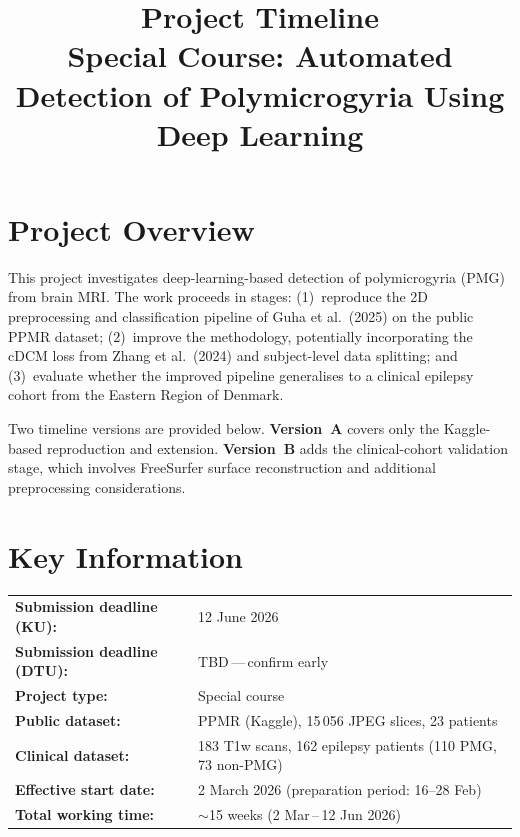 \documentclass[a4paper,11pt]{article}
\title{Project Timeline\\[0.3em]
\large Special Course: Automated Detection of Polymicrogyria Using Deep Learning}
\author{}
\date{}
\begin{document}
\maketitle

\section*{Project Overview}

This project investigates deep-learning-based detection of polymicrogyria (PMG) from brain MRI.
The work proceeds in stages: (1)~reproduce the 2D preprocessing and classification pipeline of Guha et al.\ (2025) on the public PPMR dataset; (2)~improve the methodology, potentially incorporating the cDCM loss from Zhang et al.\ (2024) and subject-level data splitting; and (3)~evaluate whether the improved pipeline generalises to a clinical epilepsy cohort from the Eastern Region of Denmark.

Two timeline versions are provided below.
\textbf{Version~A} covers only the Kaggle-based reproduction and extension.
\textbf{Version~B} adds the clinical-cohort validation stage, which involves FreeSurfer surface reconstruction and additional preprocessing considerations.

\section*{Key Information}

\begin{tabularx}{\textwidth}{@{}lX@{}}
    \textbf{Submission deadline (KU):}  & 12 June 2026 \\
    \textbf{Submission deadline (DTU):} & TBD\,---\,confirm early \\
    \textbf{Project type:}              & Special course \\
    \textbf{Public dataset:}            & PPMR (Kaggle), 15\,056 JPEG slices, 23 patients \\
    \textbf{Clinical dataset:}          & 183 T1w scans, 162 epilepsy patients (110 PMG, 73 non-PMG) \\
    \textbf{Effective start date:}      & 2 March 2026 (preparation period: 16--28 Feb) \\
    \textbf{Total working time:}        & $\sim$15 weeks (2 Mar\,--\,12 Jun 2026) \\
\end{tabularx}
\end{document}
